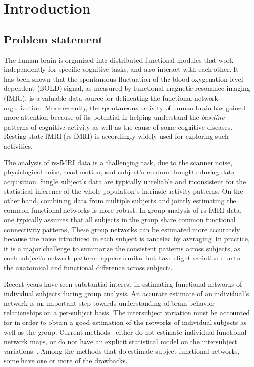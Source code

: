 \chapter{Introduction}
\label{chap1}
\vspace{-1.5\baselineskip}
\section{Problem statement}
The human brain is organized into distributed functional modules that work
independently for specific cognitive tasks, and also interact with each
other. It has been shown that the spontaneous fluctuation of the blood
oxygenation level dependent (BOLD) signal, as measured by functional magnetic
resonance imaging (fMRI), is a valuable data source for delineating the
functional network organization. More recently, the spontaneous activity of
human brain has gained more attention because of its potential in helping understand
the \emph{baseline} patterns of cognitive activity as well as the cause of some
cognitive diseases. Resting-state fMRI (rs-fMRI) is accordingly widely used for
exploring such activities.

The analysis of rs-fMRI data is a challenging task, due to the scanner noise,
physiological noise, head motion, and subject's random thoughts during data
acquisition. Single subject's data are typically unreliable and inconsistent for
the statistical inference of the whole population's intrinsic activity patterns.
On the other hand, combining data from multiple subjects and jointly estimating
the common functional networks is more robust. In group analysis of rs-fMRI
data, one typically assumes that all subjects in the group share common
functional connectivity patterns, These group networks can be estimated more
accurately because the noise introduced in each subject is canceled by
averaging. In practice, it is a major challenge to summarize the consistent
patterns across subjects, as each subject's network patterns appear similar but
have slight variation due to the anatomical and functional difference across
subjects.

Recent years have seen substantial interest in estimating functional networks of
individual subjects during group analysis. An accurate estimate of an
individual's network is an important step towards understanding of
brain-behavior relationships on a per-subject basis. The intersubject variation
must be accounted for in order to obtain a good estimation of the networks of
individual subjects as well as the group.  Current
methods~\cite{yeo2011organization,damoiseaux2006consistent} either do not
estimate individual functional network maps, or do not have an explicit statistical
model on the intersubject variations~\cite{calhoun2001method,
  calhoun2001spatial}.  Among the methods that do estimate subject functional
networks, some have one or more of the drawbacks.

